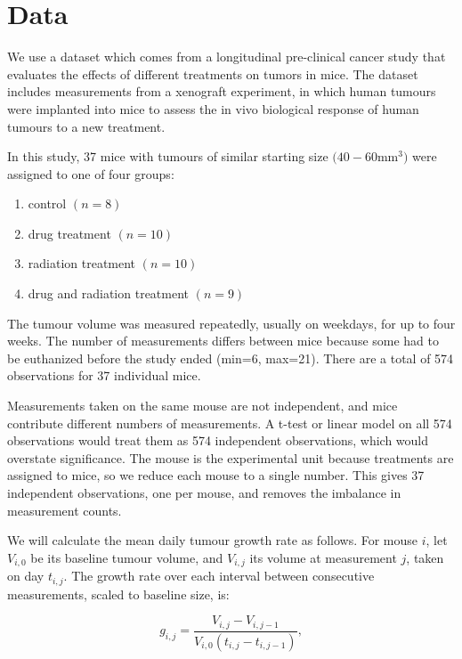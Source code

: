 \documentclass[12pt]{article}\usepackage[]{graphicx}\usepackage[]{xcolor}
\begin{document}
\section{Data}

We use a dataset which comes from a longitudinal pre-clinical cancer study that evaluates the effects of different treatments on tumors in mice. The dataset includes measurements from a xenograft experiment, in which human tumours were implanted into mice to assess the in vivo biological response of human tumours to a new treatment. 

In this study, 37 mice with tumours of similar starting size $(40-60 $mm$^3)$ were assigned to one of four groups: 

\begin{enumerate}

\item control $(n=8)$
\item drug treatment $(n=10)$
\item radiation treatment $(n=10)$
\item drug and radiation treatment $(n=9)$

\end{enumerate}

The tumour volume was measured repeatedly, usually on weekdays, for up to four weeks. The number of measurements differs between mice because some had to be euthanized before the study ended (min=6, max=21). There are a total of 574 observations for 37 individual mice. 

Measurements taken on the same mouse are not independent, and mice contribute different numbers of measurements. A t-test or linear model on all 574 observations would treat them as 574 independent observations, which would overstate significance. The mouse is the experimental unit because treatments are assigned to mice, so we reduce each mouse to a single number. This gives 37 independent observations, one per mouse, and removes the imbalance in measurement counts.

We will calculate the mean daily tumour growth rate as follows. For mouse $i$, let $V_{i,0}$ be its baseline tumour volume, and $V_{i,j}$ its volume at measurement $j$, taken on day $t_{i,j}$. The growth rate over each interval between consecutive measurements, scaled to baseline size, is:

\begin{equation*}
g_{i,j} = \frac{V_{i,j}- V_{i,j-1}}{V_{i,0} (t_{i,j} - t_{i,j-1}) },
\end{equation*}
\end{document}
